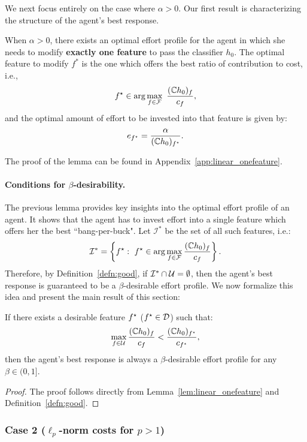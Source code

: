 \noindent 
We next focus entirely on the case where $\alpha > 0$. Our first result is characterizing the structure of the agent's best response. 

\begin{lem}\label{lem:linear_onefeature}
When $\alpha > 0$, there exists an optimal effort profile for the agent in which she needs to modify \textbf{exactly one feature} to pass the classifier $h_0$. The optimal feature to modify $f^*$ is the one which offers the best ratio of contribution to cost, i.e., 
\[
     f^\star \in \arg\max_{f \in \mathcal{F}}~\frac{(\mathbb{C} h_0)_f}{c_f}, 
\]
and the optimal amount of effort to be invested into that feature is given by: 
\[
     e_{f^\star} = \frac{\alpha}{(\mathbb{C} h_0)_{f^\star}}.
\]
\end{lem}


The proof of the lemma can be found in Appendix~\ref{app:linear_onefeature}.


\paragraph{Conditions for $\beta$-desirability.} The previous lemma provides key insights into the optimal effort profile of an agent. It shows that the agent has to invest effort into a single feature which offers her the best ``bang-per-buck". Let $\mathcal{I}^*$ be the set of all such features, i.e.:
\[
    \mathcal{I}^* = \left\{f^\star:~f^\star \in \arg\max_{f \in \mathcal{F}}\frac{(\mathbb{C} h_0)_f}{c_f} \right\}. 
\]
Therefore, by Definition~\ref{defn:good}, if $\mathcal{I}^* \cap \mathcal{U} = \emptyset$, then the agent's best response is guaranteed to be a $\beta$-desirable effort profile. We now formalize this idea and present the main result of this section:
\begin{thm}\label{thm:l1_good}
If there exists a desirable feature $f^\star$ ($f^\star \in \mathcal{D}$) such that: 
\[
      \max_{f \in \mathcal{\mathcal{U}}} \frac{(\mathbb{C} h_0)_f}{c_f} < \frac{(\mathbb{C} h_0)_{f^\star}}{c_{f^\star}},
\]
then the agent's best response is always a $\beta$-desirable effort profile for any $\beta \in (0, 1]$. 
\end{thm}
\begin{proof}
The proof follows directly from Lemma~\ref{lem:linear_onefeature} and Definition~\ref{defn:good}.
\end{proof}

\subsubsection{Case 2 ($\ell_p$-norm costs for $p > 1$)}


